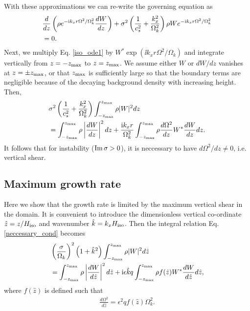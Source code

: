 With these approximations we can re-write the governing equation as
\begin{align}\label{iso_ode1}
  &\frac{d}{dz}\left(\rho e^{-\mathrm{i} k_x r
      \Omega^2/\Omega_k^2}\frac{dW}{dz}\right) +
  \sigma^2\left(\frac{1}{c_s^2}+\frac{k_x^2}{\Omega_k^2}\right) \rho W e^{-\mathrm{i} k_x r
    \Omega^2/\Omega_k^2} \notag\\
  &=0.
\end{align}
Next, we multiply Eq. \ref{iso_ode1} by $W^{*}\exp{\left(\ii k_x r
    \Omega^2/\Omega_k\right)}$ and integrate 
vertically from $z=-z_\mathrm{max}$ to $z=z_\mathrm{max}$. We assume either $W$ or
$dW/dz$ vanishes at $z=\pm z_\mathrm{max}$, or that $z_\mathrm{max}$ is sufficiently
large so that the boundary terms are negligible because of the
decaying background density with increasing height. Then,
\begin{align}\label{neccessary_cond}
   &\sigma^2\left(\frac{1}{c_s^2}+\frac{k_x^2}{\Omega_k^2}\right)\int_{-z_\mathrm{max}}^{z_\mathrm{max}}\rho|W|^2dz \notag\\
  &=\int_{-z_\mathrm{max}}^{z_\mathrm{max}}\rho\left|\frac{dW}{dz}\right|^2dz 
  +\frac{\mathrm{i} k_x r}{\Omega_k^2}\int_{-z_\mathrm{max}}^{z_\mathrm{max}}\rho\frac{d\Omega^2}{dz}W^*\frac{dW}{dz}dz. 
\end{align}
It follows that for instability ($\operatorname{Im}\sigma>0$), it is neccessary to
have $d\Omega^2/dz\neq 0$, i.e. vertical shear.  

\subsection{Maximum growth rate}   
Here we show that the growth rate is limited by the maximum vertical
shear in the domain. It is convenient to introduce the dimensionless
vertical co-ordinate $\hat{z} = z/H_\mathrm{iso}$ and wavenumber
$\hat{k}=k_xH_\mathrm{iso}$. Then 
the integral relation Eq. \ref{neccessary_cond} becomes 
\begin{align}\label{integral_relation1}
  &\left(\frac{\sigma}{\Omega_k}\right)^2\left(1+\hat{k}^2\right)
  \int_{-z_\mathrm{max}}^{z_\mathrm{max}}\rho|W|^2d\hat{z}  
  \notag\\ 
  &=\int_{-z_\mathrm{max}}^{z_\mathrm{max}}\rho\left|\frac{dW}{d\hat{z}}\right|^2d\hat{z}      
  +\mathrm{i}
  \epsilon\hat{k}q\int_{-z_\mathrm{max}}^{z_\mathrm{max}}\rho
  f(\hat{z}) W^*\frac{dW}{d\hat{z}}d\hat{z},    
\end{align}   
where $f(\hat{z})$ is defined such that
\begin{align}\label{fz_shear}
  \frac{d\Omega^2}{d\hat{z}} = \epsilon^2q f(\hat{z})\Omega_k^2.
\end{align}

